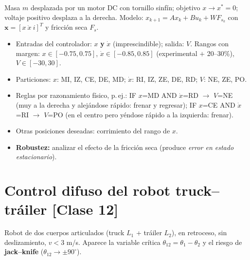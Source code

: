 \documentclass[11pt,a4paper]{article}
\newcommand{\grados}{^{\circ}}
\begin{document}
Masa $m$ desplazada por un motor DC con tornillo sinfín; objetivo $x\to x^{*}=0$; voltaje positivo desplaza a la derecha. Modelo: $x_{k+1}=Ax_k+Bu_k+WF_{s_k}$ con $\mathbf x=[x\ \dot x\ i]^T$ y fricción seca $F_s$.
\begin{itemize}[itemsep=1pt]
\item Entradas del controlador: $x$ \textbf{y} $\dot x$ (imprescindible); salida: $V$. Rangos con margen: $x\in[-0.75,0.75]$, $\dot x\in[-0.85,0.85]$ (experimental $+$ 20--30\%), $V\in[-30,30]$.
\item Particiones: $x$: MI, IZ, CE, DE, MD; $\dot x$: RI, IZ, ZE, DE, RD; $V$: NE, ZE, PO.
\item Reglas por razonamiento físico, p.\,ej.: IF $x$=MD AND $\dot x$=RD $\to$ $V$=NE (muy a la derecha y alejándose rápido: frenar y regresar); IF $x$=CE AND $\dot x$=RI $\to$ $V$=PO (en el centro pero yéndose rápido a la izquierda: frenar).
\item Otras posiciones deseadas: corrimiento del rango de $x$.
\item \textbf{Robustez:} analizar el efecto de la fricción seca (produce \emph{error en estado estacionario}).
\end{itemize}

\section{Control difuso del robot truck--tráiler \hfill {\normalsize [Clase 12]}}

Robot de dos cuerpos articulados (truck $L_1$ + tráiler $L_2$), en retroceso, sin deslizamiento, $v<3$ m/s. Aparece la variable crítica $\theta_{12}=\theta_1-\theta_2$ y el riesgo de \textbf{jack--knife} ($\theta_{12}\to\pm90\grados$).
\end{document}
